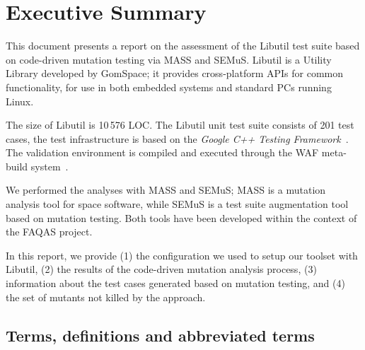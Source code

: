 
\chapter{Executive Summary}

This document presents a report on the assessment of the Libutil test suite based on code-driven mutation testing via MASS and SEMuS. 
Libutil is a Utility Library developed by GomSpace; it provides cross-platform APIs for common functionality, for use in both embedded systems and standard PCs running Linux. 


The size of Libutil is 10\,576 LOC. The Libutil unit test suite consists of 201 test cases, the test infrastructure is based on the \emph{Google C++ Testing Framework}~\cite{googletest}. The validation environment is compiled and executed through the WAF meta-build system~\cite{waf}.


We performed the analyses with MASS and SEMuS; MASS is a mutation analysis tool for space software, while SEMuS is a test suite augmentation tool based on mutation testing. Both tools have been developed within the context of the FAQAS project.

In this report, we provide (1) the configuration we used to setup our toolset with Libutil, (2) the results of the code-driven mutation analysis process, (3) information about the test cases generated based on mutation testing, and  (4) the set of mutants not killed by the approach.




\section{Terms, definitions and abbreviated terms}

